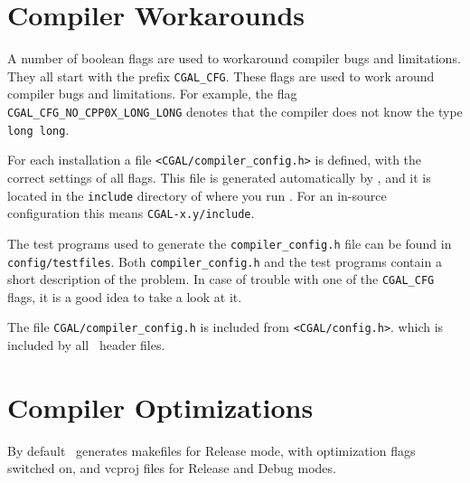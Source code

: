 \section{Compiler Workarounds}

A number of boolean flags are used to workaround compiler bugs and
limitations. They all start with the prefix \texttt{CGAL\_CFG}. These
flags are used to work around compiler bugs and limitations. For
example, the flag \texttt{CGAL\_CFG\_NO\_CPP0X\_LONG\_LONG} denotes
that the compiler does not know the type \texttt{long long}.

For each installation a file \texttt{<CGAL/compiler\_config.h>}
 is defined, with the correct
settings of all flags. This file is generated automatically by \cmake,
and it is located in the \texttt{include} directory of where you run
\cmake. For an in-source configuration this means
\texttt{CGAL-x.y/include}.

The test programs used to generate the \texttt{compiler\_config.h}
file can be found in \texttt{config/testfiles}.
 Both
\texttt{compiler\_config.h} and the test programs contain a short
description of the problem. In case of trouble with one of the
\texttt{CGAL\_CFG} flags, it is a good idea to take a look at it.

The file \texttt{CGAL/compiler\_config.h} is included from
\texttt{<CGAL/config.h>}.
which is included by all \cgal\ header files.

\section{Compiler Optimizations\label{sec:compiler-optimisations}}

By default \cmake\ generates makefiles for Release mode, with 
optimization flags switched on, and vcproj files for Release
and Debug modes.




